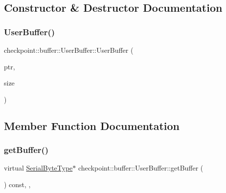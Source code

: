 \subsection{Constructor \& Destructor Documentation}
\mbox{\label{structcheckpoint_1_1buffer_1_1_user_buffer_a279907471bfa758ae71d922443973693}} 
\subsubsection{\texorpdfstring{User\+Buffer()}{UserBuffer()}}
{\footnotesize\ttfamily checkpoint\+::buffer\+::\+User\+Buffer\+::\+User\+Buffer (\begin{DoxyParamCaption}\item[{\hyperlink{namespacecheckpoint_ae57f01cdc0b81776c23b6c7c934c58f5}{Serial\+Byte\+Type} $\ast$}]{ptr,  }\item[{\hyperlink{namespacecheckpoint_a083f6674da3f94c2901b18c6d238217c}{Serial\+Size\+Type} const \&}]{size }\end{DoxyParamCaption})\hspace{0.3cm}{\ttfamily [inline]}}



\subsection{Member Function Documentation}
\mbox{\label{structcheckpoint_1_1buffer_1_1_user_buffer_a1a71a6378472d56c8c17f01dd44462b7}} 
\subsubsection{\texorpdfstring{get\+Buffer()}{getBuffer()}}
{\footnotesize\ttfamily virtual \hyperlink{namespacecheckpoint_ae57f01cdc0b81776c23b6c7c934c58f5}{Serial\+Byte\+Type}$\ast$ checkpoint\+::buffer\+::\+User\+Buffer\+::get\+Buffer (\begin{DoxyParamCaption}{ }\end{DoxyParamCaption}) const\hspace{0.3cm}{\ttfamily [inline]}, {\ttfamily [override]}, {\ttfamily [virtual]}}



